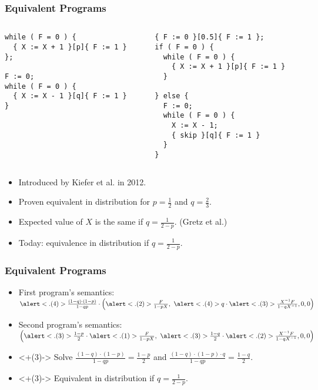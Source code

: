 \begin{frame}[fragile]
	\frametitle{Equivalent Programs}
	\begin{columns}
		\begin{column}[t]{0.5\textwidth}
			\begin{lstlisting}[basicstyle=\tiny]
while ( F = 0 ) {
  { X := X + 1 }[p]{ F := 1 }
};

F := 0;
while ( F = 0 ) {
  { X := X - 1 }[q]{ F := 1 }
}
			\end{lstlisting}
		\end{column}
		\begin{column}[t]{0.5\textwidth}
			\begin{lstlisting}[basicstyle=\tiny]
{ F := 0 }[0.5]{ F := 1 };
if ( F = 0 ) {
  while ( F = 0 ) {
    { X := X + 1 }[p]{ F := 1 }
  }

} else {
  F := 0;
  while ( F = 0 ) {
    X := X - 1;
    { skip }[q]{ F := 1 }
  }
}
			\end{lstlisting}
		\end{column}
	\end{columns}
	\begin{itemize}[<+->]
		\item Introduced by Kiefer et al. in 2012.
		\item Proven equivalent in distribution for $p = \frac{1}{2}$ and $q = \frac{2}{3}$.
		\item Expected value of $X$ is the same if $q = \frac{1}{2-p}$. (Gretz et al.)
		\item Today: equivalence in distribution if $q = \frac{1}{2-p}$.
	\end{itemize}
\end{frame}

\begin{frame}
	\frametitle{Equivalent Programs}
	\begin{itemize}[<+->]
		\item First program's semantics: \\[10pt]
			$ \alert<.(4)>{ \frac{(1-q) \cdot (1-p)}{1-qp} } \cdot	%
			\pair{
				\alert<.(2)>{ \frac{F}{1 - p X} }, \ %
				\alert<.(4)>{ q } \cdot	%
					\alert<.(3)>{ \frac{X^{-1} F}{1 - q X^{-1}} } %
				, 0, 0 %
			} $
			\vspace*{20pt}
		\item Second program's semantics: \\[10pt]
			$ \pair{
				\alert<.(3)>{ \frac{1-p}{2} } \cdot	%
					\alert<.(1)>{ \frac{F}{1 - p X} }, \ %
				\alert<.(3)>{ \frac{1-q}{2} } \cdot	%
					\alert<.(2)>{ \frac{X^{-1} F}{1 - q X^{-1}} } %
					, 0, 0 %
			} $
			\vspace*{20pt}
		\item<+(3)-> Solve $ \frac{(1-q) \cdot (1-p)}{1-qp} = \frac{1-p}{2} $ and
			$ \frac{(1-q) \cdot (1-p) \cdot q}{1-qp} = \frac{1-q}{2} $.
			\vspace*{10pt}
		\item<+(3)-> Equivalent in distribution if $ q = \frac{1}{2 - p}$.
	\end{itemize}
\end{frame}
